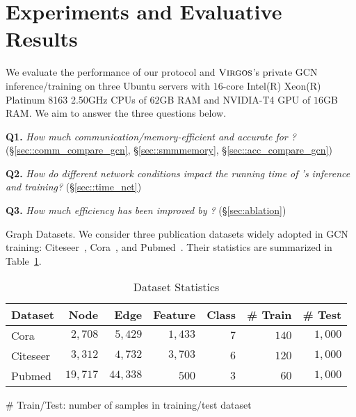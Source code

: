 
\section{Experiments and Evaluative Results}

We evaluate the performance of our \osmm protocol and $\textnormal{\textsc{Virgos}}$'s private GCN inference/training on three Ubuntu servers with $16$-core Intel(R) Xeon(R) Platinum 8163 2.50GHz CPUs of $62$GB
RAM and NVIDIA-T4 GPU of $16$GB RAM.
We aim to answer the three questions below.

\noindent\textbf{Q1.} \emph{How much communication/memory-efficient and accurate for \cgnn?} (\S\ref{sec::comm_compare_gcn}, \S\ref{sec::smmmemory}, \S\ref{sec::acc_compare_gcn})

\noindent\textbf{Q2.} \emph{How do different network conditions impact the running time of \cgnn's inference and training?} (\S\ref{sec::time_net})

\noindent\textbf{Q3.} \emph{How much efficiency has been improved by \osmm?} (\S\ref{sec:ablation})


{Graph Datasets.}
We consider three publication datasets widely adopted in GCN training: Citeseer~\cite{dl/GilesBL98}, Cora~\cite{aim/SenNBGGE08}, and Pubmed~\cite{ijcnlp/DernoncourtL17}.
Their statistics are summarized in Table~\ref{tab:datasets}.
\begin{table}[!t]
\centering
\caption{Dataset Statistics}
\setlength\tabcolsep{2pt}
\begin{tabular}{l|rrrr|rr}
\hline
\multicolumn{1}{c|}{\textbf{Dataset}} & \textbf{Node} & \textbf{Edge} & \textbf{Feature} & \textbf{Class} &\textbf{\# Train} &\textbf{\# Test}
\\ \hline
Cora 	 & $2,708$ 	 & $5,429$ 	 & $1,433$ & $7$ & $140$ & $1,000$ \\
Citeseer 	 	 & $3,312$ 	 & $4,732$ 	 & $3,703$ 	 & $6$ & $120$ & $1,000$ \\
Pubmed 	 	 & $19,717$ 	 	 & $44,338$ 	 	 & $500$ 	 & $3$ 	 & $60$ & $1,000$ \\
\hline
\end{tabular}
\begin{tablenotes}
\item \# Train/Test: number of samples in training/test dataset
\end{tablenotes}
\label{tab:datasets}
\end{table}

